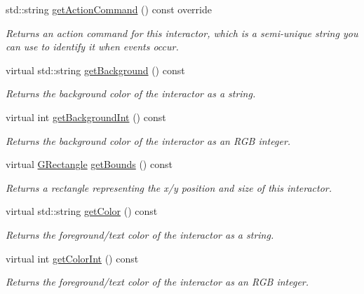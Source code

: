 \begin{DoxyCompactItemize}
std\+::string \mbox{\hyperlink{classsgl_1_1GRadioButton_a4f83505141da1f8446f0e0e0a9507930}{get\+Action\+Command}} () const override
\begin{DoxyCompactList}\small\item\em Returns an action command for this interactor, which is a semi-\/unique string you can use to identify it when events occur. \end{DoxyCompactList}\item 
virtual std\+::string \mbox{\hyperlink{classsgl_1_1GInteractor_a808e22cc1fdfbecf71ed8c64ef4600e0}{get\+Background}} () const
\begin{DoxyCompactList}\small\item\em Returns the background color of the interactor as a string. \end{DoxyCompactList}\item 
virtual int \mbox{\hyperlink{classsgl_1_1GInteractor_a9e827257a55cb8cf4d9de2ec6bcfd7a0}{get\+Background\+Int}} () const
\begin{DoxyCompactList}\small\item\em Returns the background color of the interactor as an R\+GB integer. \end{DoxyCompactList}\item 
virtual \mbox{\hyperlink{structsgl_1_1GRectangle}{G\+Rectangle}} \mbox{\hyperlink{classsgl_1_1GInteractor_a29e6ac35a0b48f491a4c88194cc5da3b}{get\+Bounds}} () const
\begin{DoxyCompactList}\small\item\em Returns a rectangle representing the x/y position and size of this interactor. \end{DoxyCompactList}\item 
virtual std\+::string \mbox{\hyperlink{classsgl_1_1GInteractor_aa061dfa488c31e18549d64363c1d0e34}{get\+Color}} () const
\begin{DoxyCompactList}\small\item\em Returns the foreground/text color of the interactor as a string. \end{DoxyCompactList}\item 
virtual int \mbox{\hyperlink{classsgl_1_1GInteractor_a9635c7af766cdc3417f346683fa0e6c1}{get\+Color\+Int}} () const
\begin{DoxyCompactList}\small\item\em Returns the foreground/text color of the interactor as an R\+GB integer. \end{DoxyCompactList}\item 

\end{DoxyCompactItemize}
